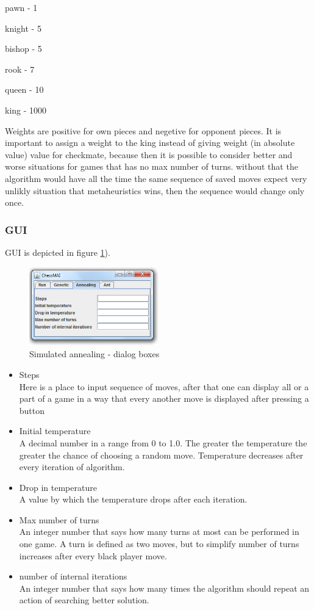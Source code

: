 \documentclass[pdftex]{article}
\begin{document}
pawn - 1

knight - 5

bishop - 5

rook - 7

queen - 10

king - 1000

Weights are positive for own pieces and negetive for opponent pieces.
It is important to assign a weight to the king instead of giving weight (in absolute value) value for checkmate, because then it is possible to consider better and worse situations for games that has no max number of turns. without that the algorithm would have all the time the same sequence of saved moves expect very unlikly situation that metaheuristics wins, then the sequence would change only once.

\subsubsection{GUI}
GUI is depicted in figure \ref{fig:annealingTab}).
\begin{figure}[!htb]
	\centering
	\includegraphics[width=0.5\textwidth]{annealing/GUI.png} 
	\caption{Simulated annealing - dialog boxes}
	\label{fig:annealingTab}
\end{figure}

\begin{itemize}
 	\item Steps \hfill \\
Here is a place to input sequence of moves, after that one can display all or a part of a game in a way that every another move is displayed after pressing  a button

	\item Initial temperature \hfill \\
A decimal number in a range from 0 to 1.0. The greater the temperature the greater the chance of choosing a random move. Temperature decreases after every iteration of algorithm.
 	\item Drop in temperature \hfill \\
A value by which the temperature drops after each iteration.
	\item Max number of turns \hfill \\
An integer number that says how many turns at most can be performed in one game. A turn is defined as two moves, but to simplify number of turns increases after every black player move.
	\item number of internal iterations \hfill \\
An integer number that says how many times the algorithm should repeat an action of searching better solution.
\end{itemize}
\end{document}
